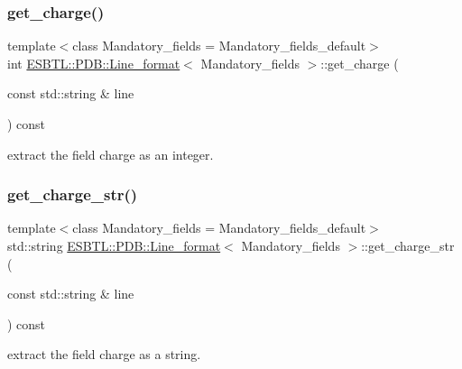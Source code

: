 \subsubsection{\texorpdfstring{get\+\_\+charge()}{get\_charge()}}
{\footnotesize\ttfamily template$<$class Mandatory\+\_\+fields  = Mandatory\+\_\+fields\+\_\+default$>$ \\
int \hyperlink{classESBTL_1_1PDB_1_1Line__format}{E\+S\+B\+T\+L\+::\+P\+D\+B\+::\+Line\+\_\+format}$<$ Mandatory\+\_\+fields $>$\+::get\+\_\+charge (\begin{DoxyParamCaption}\item[{const std\+::string \&}]{line }\end{DoxyParamCaption}) const\hspace{0.3cm}{\ttfamily [inline]}}

extract the field charge as an integer. \mbox{\label{classESBTL_1_1PDB_1_1Line__format_ada983c443ea270cc31d9337121ca4e58}} 
\subsubsection{\texorpdfstring{get\+\_\+charge\+\_\+str()}{get\_charge\_str()}}
{\footnotesize\ttfamily template$<$class Mandatory\+\_\+fields  = Mandatory\+\_\+fields\+\_\+default$>$ \\
std\+::string \hyperlink{classESBTL_1_1PDB_1_1Line__format}{E\+S\+B\+T\+L\+::\+P\+D\+B\+::\+Line\+\_\+format}$<$ Mandatory\+\_\+fields $>$\+::get\+\_\+charge\+\_\+str (\begin{DoxyParamCaption}\item[{const std\+::string \&}]{line }\end{DoxyParamCaption}) const\hspace{0.3cm}{\ttfamily [inline]}}

extract the field charge as a string. \mbox{\label{classESBTL_1_1PDB_1_1Line__format_ad38fda5e9c5d68d7da40356119f8537e}} 
